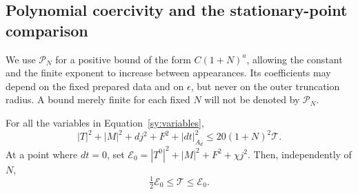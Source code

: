 \subsection{Polynomial coercivity and the stationary-point comparison}

We use $\mathcal P_N$ for a positive bound of the form
$C(1+N)^a$, allowing the constant and the finite exponent to increase
between appearances.  Its coefficients may depend on the fixed
prepared data and on $\epsilon$, but never on the outer truncation
radius.  A bound merely finite for each fixed $N$ will not be denoted
by $\mathcal P_N$.

\begin{proposition}[Coercivity]\label{sy:coercivity}
For all the variables in Equation~\ref{sy:variables},
\begin{equation}\label{sy:coercivity-estimate}
 |T|^2+|M|^2+dj^2+F^2+|dt|_{A_d}^2
 \le20(1+N)^2\mathcal T.
\end{equation}
At a point where $dt=0$, set
$\mathcal E_0=|T^0|^2+|M|^2+F^2+\chi j^2$.
Then, independently of $N$,
\begin{equation}\label{sy:stationary-coercivity}
 \tfrac12\mathcal E_0\le\mathcal T\le\mathcal E_0.
\end{equation}
\end{proposition}

